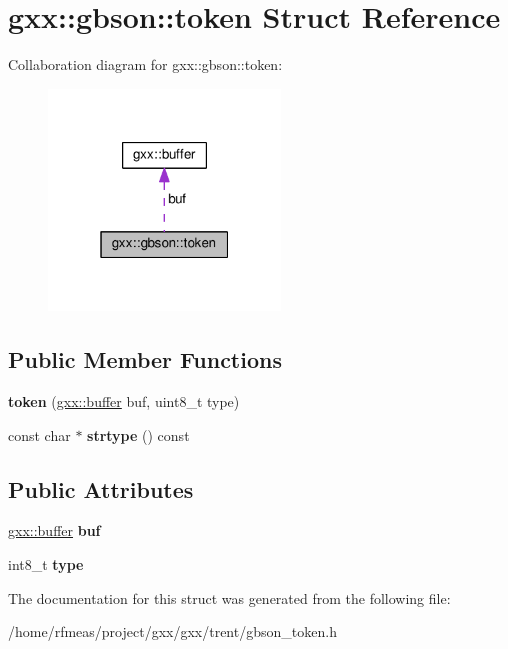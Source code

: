 \hypertarget{structgxx_1_1gbson_1_1token}{}\section{gxx\+:\+:gbson\+:\+:token Struct Reference}
\label{structgxx_1_1gbson_1_1token}


Collaboration diagram for gxx\+:\+:gbson\+:\+:token\+:
\nopagebreak
\begin{figure}[H]
\begin{center}
\leavevmode
\includegraphics[width=175pt]{structgxx_1_1gbson_1_1token__coll__graph}
\end{center}
\end{figure}
\subsection*{Public Member Functions}
\begin{DoxyCompactItemize}
\item 
{\bfseries token} (\hyperlink{classgxx_1_1buffer}{gxx\+::buffer} buf, uint8\+\_\+t type)\hypertarget{structgxx_1_1gbson_1_1token_ac3a6e362108926a8b995f6bcb090d132}{}\label{structgxx_1_1gbson_1_1token_ac3a6e362108926a8b995f6bcb090d132}

\item 
const char $\ast$ {\bfseries strtype} () const \hypertarget{structgxx_1_1gbson_1_1token_a0edaedc5f9da4b80419def0af0b11cf1}{}\label{structgxx_1_1gbson_1_1token_a0edaedc5f9da4b80419def0af0b11cf1}

\end{DoxyCompactItemize}
\subsection*{Public Attributes}
\begin{DoxyCompactItemize}
\item 
\hyperlink{classgxx_1_1buffer}{gxx\+::buffer} {\bfseries buf}\hypertarget{structgxx_1_1gbson_1_1token_a4a2be446afa1738cba0085d9278d39fd}{}\label{structgxx_1_1gbson_1_1token_a4a2be446afa1738cba0085d9278d39fd}

\item 
int8\+\_\+t {\bfseries type}\hypertarget{structgxx_1_1gbson_1_1token_a62cc178262e0215d13920d3a65686cc0}{}\label{structgxx_1_1gbson_1_1token_a62cc178262e0215d13920d3a65686cc0}

\end{DoxyCompactItemize}


The documentation for this struct was generated from the following file\+:\begin{DoxyCompactItemize}
\item 
/home/rfmeas/project/gxx/gxx/trent/gbson\+\_\+token.\+h\end{DoxyCompactItemize}
